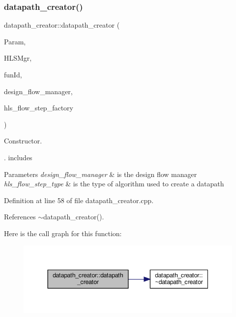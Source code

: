 \subsubsection{\texorpdfstring{datapath\+\_\+creator()}{datapath\_creator()}}
{\footnotesize\ttfamily datapath\+\_\+creator\+::datapath\+\_\+creator (\begin{DoxyParamCaption}\item[{const \hyperlink{Parameter_8hpp_a37841774a6fcb479b597fdf8955eb4ea}{Parameter\+Const\+Ref}}]{Param,  }\item[{const \hyperlink{hls__manager_8hpp_acd3842b8589fe52c08fc0b2fcc813bfe}{H\+L\+S\+\_\+manager\+Ref}}]{H\+L\+S\+Mgr,  }\item[{unsigned int}]{fun\+Id,  }\item[{const Design\+Flow\+Manager\+Const\+Ref}]{design\+\_\+flow\+\_\+manager,  }\item[{const \hyperlink{hls__step_8hpp_ada16bc22905016180e26fc7e39537f8d}{H\+L\+S\+Flow\+Step\+\_\+\+Type}}]{hls\+\_\+flow\+\_\+step\+\_\+factory }\end{DoxyParamCaption})}



Constructor. 

. includes


\begin{DoxyParams}{Parameters}
{\em design\+\_\+flow\+\_\+manager} & is the design flow manager \\
\hline
{\em hls\+\_\+flow\+\_\+step\+\_\+type} & is the type of algorithm used to create a datapath \\
\hline
\end{DoxyParams}


Definition at line 58 of file datapath\+\_\+creator.\+cpp.



References $\sim$datapath\+\_\+creator().

Here is the call graph for this function\+:
\nopagebreak
\begin{figure}[H]
\begin{center}
\leavevmode
\includegraphics[width=344pt]{dd/d45/classdatapath__creator_a9dde5d77f557acd8ce5dc6efb11fb56e_cgraph}
\end{center}
\end{figure}
\mbox{\label{classdatapath__creator_a1787dd3af42d845b50187fc6b8f1900c}} 
